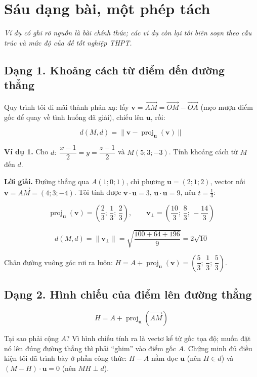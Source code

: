 \documentclass[12pt,a4paper]{article}
\begin{document}
\section{Sáu dạng bài, một phép tách}

\emph{Ví dụ có ghi rõ nguồn là bài chính thức; các ví dụ còn lại tôi biên soạn theo cấu trúc và mức độ của đề tốt nghiệp THPT.}

\subsection*{Dạng 1. Khoảng cách từ điểm đến đường thẳng}

Quy trình tôi đi mãi thành phản xạ: lấy $\mathbf{v} = \overrightarrow{AM} = \overrightarrow{OM} - \overrightarrow{OA}$ (mẹo mượn điểm gốc để quay về tình huống đã giải), chiếu lên $\mathbf{u}$, rồi:

$$
d(M,d) = \bigl\| \mathbf{v} - \operatorname{proj}_{\mathbf{u}}(\mathbf{v}) \bigr\|
$$

\textbf{Ví dụ 1.} Cho $d:\;\dfrac{x-1}{2}=y=\dfrac{z-1}{2}$ và $M(5;3;-3)$. Tính khoảng cách từ $M$ đến $d$.

\textbf{Lời giải.} Đường thẳng qua $A(1;0;1)$, chỉ phương $\mathbf{u}=(2;1;2)$, vector nối $\mathbf{v} = \overrightarrow{AM} = (4;3;-4)$. Tôi tính được $\mathbf{v}\cdot\mathbf{u}=3$, $\mathbf{u}\cdot\mathbf{u}=9$, nên $t=\frac{1}{3}$:

$$
\operatorname{proj}_{\mathbf{u}}(\mathbf{v}) = \left(\frac{2}{3};\,\frac{1}{3};\,\frac{2}{3}\right),
\qquad
\mathbf{v}_{\perp} = \left(\frac{10}{3};\,\frac{8}{3};\,-\frac{14}{3}\right)
$$

$$
d(M,d) = \|\mathbf{v}_{\perp}\| = \sqrt{\frac{100+64+196}{9}} = 2\sqrt{10}
$$

Chân đường vuông góc rơi ra luôn: $H = A + \operatorname{proj}_{\mathbf{u}}(\mathbf{v}) = \left(\dfrac{5}{3};\,\dfrac{1}{3};\,\dfrac{5}{3}\right)$.

\subsection*{Dạng 2. Hình chiếu của điểm lên đường thẳng}

$$
\boxed{\;H = A + \operatorname{proj}_{\mathbf{u}}(\overrightarrow{AM})\;}
$$

Tại sao phải cộng $A$? Vì hình chiếu tính ra là vectơ kể từ gốc tọa độ; muốn đặt nó lên đúng đường thẳng thì phải ``ghim'' vào điểm gốc $A$. Chứng minh đủ điều kiện tôi đã trình bày ở phần công thức: $H-A$ nằm dọc $\mathbf{u}$ (nên $H \in d$) và $(M-H)\cdot\mathbf{u}=0$ (nên $MH \perp d$).
\end{document}
